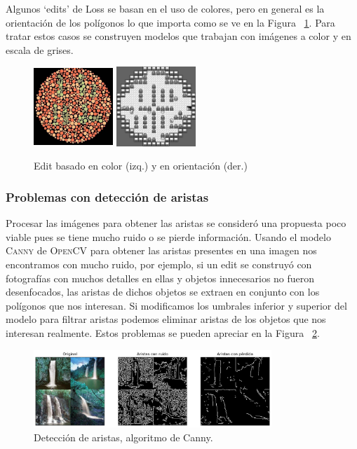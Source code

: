 \documentclass[spanish,11pt,letterpaper]{article}
\begin{document}
Algunos `edits' de Loss se basan en el uso de colores, pero en general es la
orientación de los polígonos lo que importa como se ve en la Figura ~\ref{fig:color}.
Para tratar estos casos se construyen modelos que trabajan con imágenes a color
y en escala de grises.

\begin{figure}[h]
\centering
\includegraphics[height=3cm,width=3cm]{loss_color}
\includegraphics[height=3cm,width=3cm]{pokemon}
\caption{Edit basado en color (izq.) y en orientación (der.)}
\label{fig:color}
\end{figure}

\subsubsection{Problemas con detección de aristas}

Procesar las imágenes para obtener las aristas se consideró una propuesta poco
viable pues se tiene mucho ruido o se pierde información. Usando el modelo
\textsc{Canny} de \textsc{OpenCV} para obtener las aristas presentes en una imagen
nos encontramos con mucho ruido, por ejemplo, si un edit se construyó con fotografías
con muchos detalles en ellas y objetos innecesarios no fueron desenfocados, las
aristas de dichos objetos se extraen en conjunto con los polígonos que nos
interesan. Si modificamos los umbrales inferior y superior del modelo para filtrar
aristas podemos eliminar aristas de los objetos que nos interesan realmente. Estos
problemas se pueden apreciar en la Figura ~\ref{fig:canny}.

\begin{figure}[h]
\centering
\includegraphics[width=0.8\textwidth]{edges}
\caption{Detección de aristas, algoritmo de Canny.}
\label{fig:canny}
\end{figure}
\end{document}

